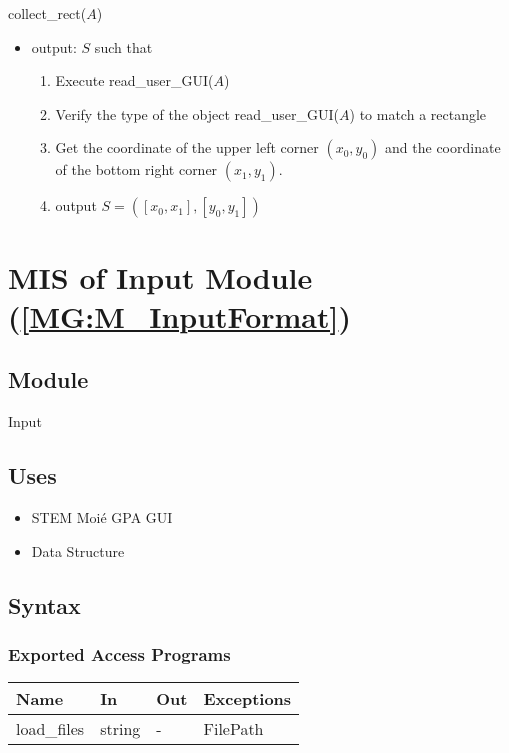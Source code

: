 \documentclass[12pt, titlepage]{article}
\begin{document}
\noindent collect{\_}rect($A$)
\begin{itemize}
\item output: $S$ such that
	\begin{enumerate}
	\item Execute read{\_}user{\_}GUI($A$)
	\item Verify the type of the object read{\_}user{\_}GUI($A$) to match a rectangle
	\item Get the coordinate of the upper left corner $(x_0,y_0)$ and the coordinate of the bottom right corner $(x_1,y_1)$. 
	\item output $S=([x_0,x_1],[y_0,y_1])$
	\end{enumerate} 
\end{itemize}
\bigskip

\section{MIS of Input Module (\texorpdfstring{\cref{MG:M_InputFormat}}))} \label{MIS_Input}

\subsection{Module}
Input
\subsection{Uses}
\begin{itemize}
\item STEM Moi{\'e} GPA GUI
\item Data Structure
\end{itemize}

\subsection{Syntax}

\subsubsection{Exported Access Programs}

\begin{center}
\begin{tabular}{p{4cm} p{4cm} p{4cm} p{2cm}}
\hline
\textbf{Name} & \textbf{In} & \textbf{Out} & \textbf{Exceptions} \\
\hline
load{\_}files & string & - & FilePath \\
\hline
\end{tabular}
\end{center}
\end{document}
